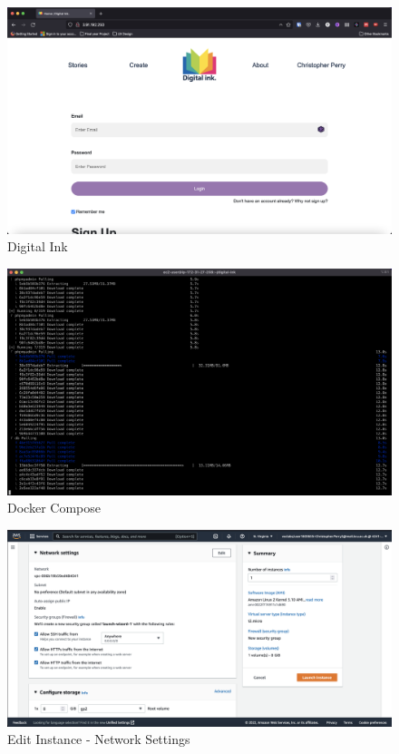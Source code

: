 \begin{figure}[H]
    \centering
        \includegraphics[width=\textwidth]{resources/digital-ink.png}
    \caption{Digital Ink}
    \label{fig:digital-ink}
\end{figure}

\begin{figure}[H]
    \centering
        \includegraphics[width=\textwidth]{resources/docker-compose.png}
    \caption{Docker Compose}
    \label{fig:docker-compose}
\end{figure}

\begin{figure}[H]
    \centering
        \includegraphics[width=\textwidth]{resources/edit-instance-network-settings.png}
    \caption{Edit Instance - Network Settings}
    \label{fig:edit-instance-network-settings}
\end{figure}

